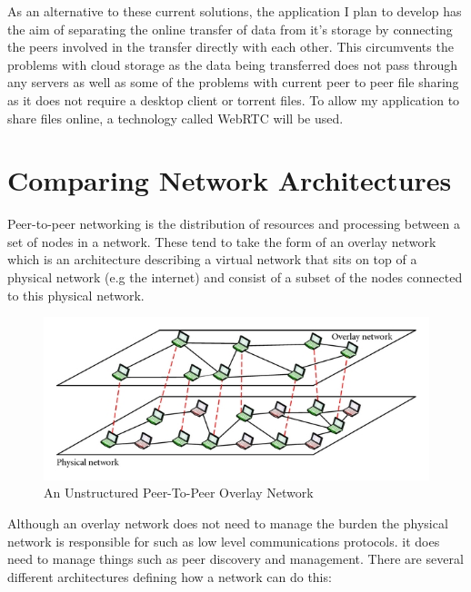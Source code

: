 \documentclass[]{report}
\begin{document}
	As an alternative to these current solutions, the application I plan to develop has the aim of separating the online transfer of data from it's storage by connecting the peers involved in the transfer directly with each other. This circumvents the problems with cloud storage as the data being transferred does not pass through any servers as well as some of the problems with current peer to peer file sharing as it does not require a desktop client or torrent files. To allow my application to share files online, a technology called WebRTC will be used.
	
	\section{Comparing Network Architectures}	
	Peer-to-peer networking is the distribution of resources and processing between a set of nodes in a network. These tend to take the form of an overlay network which is an architecture describing a virtual network that sits on top of a physical network (e.g the internet) and consist of a subset of the nodes connected to this physical network.
	
	\begin{figure}[H]
		\caption{
			An Unstructured Peer-To-Peer Overlay Network 	
			\cite{Unstructured P2P Diagram}
		}
		\centering
		\includegraphics{overlaynetwork.jpg}
	\end{figure}
	
	Although an overlay network does not need to manage the burden the physical network is responsible for such as low level communications protocols. it does need to manage things such as peer discovery and management. There are several different architectures defining how a network can do this:
	
\end{document}
